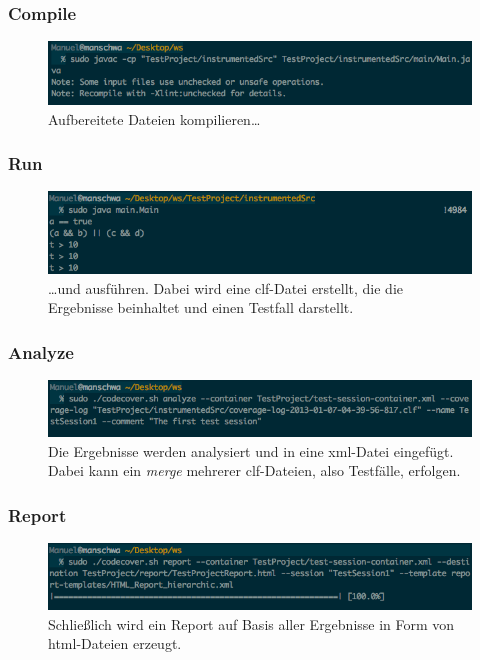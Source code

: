\documentclass{beamer}
\begin{document}
  \begin{frame}\frametitle{Compile}
    \begin{figure}%
			\includegraphics[width=\columnwidth]{pictures/demo_commandline/02_compile.png}%
			\caption{Aufbereitete Dateien kompilieren\dots}%
			\label{}%
		\end{figure}
  \end{frame}
  
  \begin{frame}\frametitle{Run}
    \begin{figure}%
			\includegraphics[width=\columnwidth]{pictures/demo_commandline/03_run.png}%
			\caption{\dots und ausführen. Dabei wird eine clf-Datei erstellt, die die Ergebnisse beinhaltet und einen Testfall darstellt.}%
			\label{}%
		\end{figure}
  \end{frame}
  
  \begin{frame}\frametitle{Analyze}
    \begin{figure}%
			\includegraphics[width=\columnwidth]{pictures/demo_commandline/04_analyse.png}%
			\caption{Die Ergebnisse werden analysiert und in eine xml-Datei eingefügt. Dabei kann ein \textit{merge} mehrerer clf-Dateien, also Testfälle, erfolgen.}%
			\label{}%
		\end{figure}
  \end{frame}
  
  \begin{frame}\frametitle{Report}
    \begin{figure}%
			\includegraphics[width=\columnwidth]{pictures/demo_commandline/05_report.png}%
			\caption{Schließlich wird ein Report auf Basis aller Ergebnisse in Form von html-Dateien erzeugt.}%
			\label{}%
		\end{figure}
  \end{frame}
  
\end{document}
